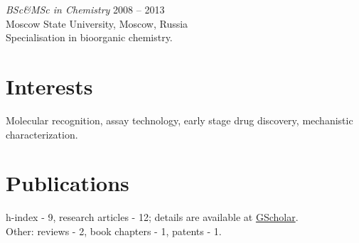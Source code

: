 \documentclass[margin]{res}
\begin{document}
\begin{resume}
            {\sl BSc\&MSc in Chemistry} \hfill 2008 -- 2013 \\
            Moscow State University, Moscow, Russia \\
            Specialisation in bioorganic chemistry.
                        
        \section{Interests} Molecular recognition, assay technology, early stage drug discovery, mechanistic characterization.
        
        \section{Publications}

            \nocite{*}
            h-index - 9, research articles - 12; details are available at \href{https://scholar.google.com/citations?hl=sv&user=H5uK2zsAAAAJ&view_op=list_works&authuser=2&sortby=pubdate}{GScholar}.\\
            Other: reviews - 2, book chapters - 1, patents  - 1.\\
            

    \end{resume}
\end{document}
